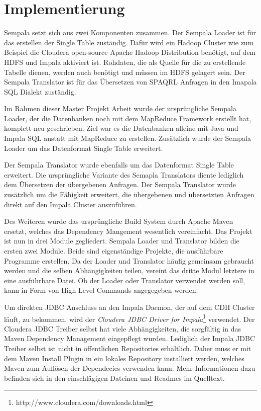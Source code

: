 \documentclass[
  a4paper,
  12pt,
  oneside,
  parskip=half,
  headsepline,
]{scrartcl}
\begin{document}
\section{Implementierung}
\label{sec:implementation}

Sempala setzt sich aus zwei Komponenten zusammen. Der Sempala Loader ist für das
erstellen der Single Table zuständig. Dafür wird ein Hadoop Cluster wie zum
Beispiel die Cloudera open-source Apache Hadoop Distribution benötigt, auf dem
HDFS und Impala aktiviert ist. Rohdaten, die als Quelle für die zu erstellende
Tabelle dienen, werden auch benötigt und müssen im HDFS gelagert sein. Der
Sempala Translator ist für das Übersetzen von SPAQRL Anfragen in den Imapala SQL
Dialekt zuständig.

Im Rahmen dieser Master Projekt Arbeit wurde der ursprüngliche Sempala Loader,
der die Datenbanken noch mit dem MapReduce Framework erstellt hat, komplett neu
geschrieben. Ziel war es die Datenbanken alleine mit Java und Impala SQL
anstatt mit MapReduce zu erstellen. Zusätzlich wurde der Sempala Loader um das
Datenformat Single Table erweitert.

Der Sempala Translator wurde ebenfalls um das Datenformat Single Table erweitert.
Die ursprüngliche Variante des Semapla Translators diente lediglich dem
Übersetzen der übergebenen Anfragen. Der Sempala Translator wurde zusätzlich um
die Fähigkeit erweitert, die übergebenen und übersetzten Anfragen direkt auf den
Impala Cluster auszuführen.

Des Weiteren wurde das ursprüngliche Build System durch Apache Maven ersetzt,
welches das Dependency Mangement wesentlich vereinfacht. Das Projekt ist nun in
drei Module gegliedert. Sempala Loader und Translator bilden die ersten zwei
Module. Beide sind eigenständige Projekte, die ausführbare Programme erstellen.
Da der Loader und Translator häufig gemeinsam gebraucht werden und die selben
Abhängigkeiten teilen, vereint das dritte Modul letztere in eine ausführbare
Datei. Ob der Loader oder Translator verwendet werden soll, kann in Form von
High Level Commands angegegeben werden.

Um direkten JDBC Anschluss an den Impala Daemon, der auf dem CDH Cluster läuft,
zu bekommen, wird der \textit{Cloudera JDBC Driver for
Impala}\footnote{http://www.cloudera.com/downloads.html} verwendet. Der Cloudera
JDBC Treiber selbst hat viele Abhängigkeiten, die sorgfältig in das Maven
Dependency Management eingepflegt wurden. Lediglich der Impala JDBC Treiber
selbst ist nicht in öffentlichen Repositories erhältlich. Daher muss er mit dem
Maven Install Plugin in ein lokales Repository installiert werden, welches Maven
zum Auflösen der Dependecies verwenden kann. Mehr Informationen dazu befinden 
sich in den einschlägigen Dateinen und Readmes im Quelltext.
\end{document}
